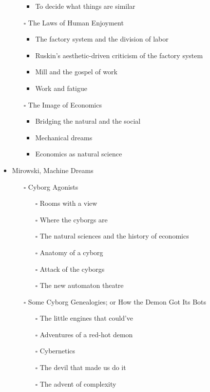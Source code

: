 \documentclass[paper=B6,portrait,twoside=true,twocolumn=false,headinclude=true,footinclude=false,fontsize=12,BCOR=10mm,DIV=calc,pagesize=auto,titlepage=firstiscover,mpinclude=false,headings=normal,headings=twolinechapter,open=right,toc=graduated,chapterprefix=false,numbers=endperiod,parskip=half+]{scrbook}
\theoremstyle{definition}
\begin{document}
\begin{itemize}
\begin{itemize}
\begin{itemize}
\item To decide what things are similar
\end{itemize}
\item[{$\square$}] The Laws of Human Enjoyment
\begin{itemize}
\item The factory system and the division of labor
\item Ruskin's aesthetic-driven criticism of the factory system
\item Mill and the gospel of work
\item Work and fatigue
\end{itemize}
\item[{$\square$}] The Image of Economics
\begin{itemize}
\item Bridging the natural and the social
\item Mechanical dreams
\item Economics as natural science
\end{itemize}
\end{itemize}
\item\relax [0/8] Mirowski, Machine Dreams
\begin{itemize}
\item[{$\square$}] Cyborg Agonists
\begin{itemize}
\item[{$\square$}] Rooms with a view
\item[{$\square$}] Where the cyborgs are
\item[{$\square$}] The natural sciences and the history of economics
\item[{$\square$}] Anatomy of a cyborg
\item[{$\square$}] Attack of the cyborgs
\item[{$\square$}] The new automaton theatre
\end{itemize}
\item[{$\square$}] Some Cyborg Genealogies; or How the Demon Got Its Bots
\begin{itemize}
\item[{$\square$}] The little engines that could've
\item[{$\square$}] Adventures of a red-hot demon
\item[{$\square$}] Cybernetics
\item[{$\square$}] The devil that made us do it
\item[{$\square$}] The advent of complexity
\end{itemize}

\end{itemize}
\end{itemize}
\end{document}
